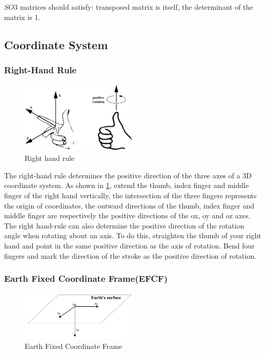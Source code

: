 \documentclass{article} %
\numberwithin{equation}{section} %
\begin{document}
$SO3$ matrices should satisfy: transposed matrix is itself, the determinant of the matrix is 1.

\subsection{Coordinate System}

\subsubsection{Right-Hand Rule}\label{right_hand_rule}

\begin{figure}[htbp]
\centering
\includegraphics[width=0.50\textwidth]{right_hand_rule.pdf}
\caption{Right hand rule}
\label{fig:right_hand_rule}
\end{figure}

The right-hand rule determines the positive direction of the three axes of a 3D coordinate system.
As shown in \ref{fig:right_hand_rule}, extend the thumb, index finger and middle finger of the right hand vertically, the intersection of the three fingers represents the origin of coordinates, the outward directions of the thumb, index finger and middle finger are respectively the positive directions of the ox, oy and oz axes.
The right hand-rule can also determine the positive direction of the rotation angle when rotating about an axis.
To do this, straighten the thumb of your right hand and point in the same positive direction as the axis of rotation. Bend four fingers and mark the direction of the stroke as the positive direction of rotation.

\subsubsection{Earth Fixed Coordinate Frame(EFCF)}
\begin{figure}[htbp]
\centering
\includegraphics[width=0.50\textwidth]{earth_surface_coordinate.pdf}
\caption{Earth Fixed Coordinate Frame}
\end{figure}
\end{document}
